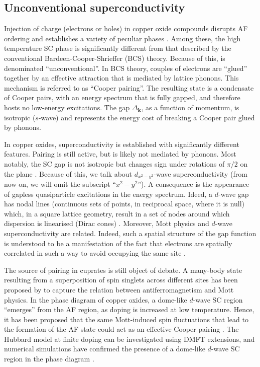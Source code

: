 \subsection{Unconventional superconductivity}\label{subsec:sc-cuprates}

Injection of charge (electrons or holes) in copper oxide compounds disrupts AF ordering and establishes a variety of peculiar phases \cite{keimer2015quantum}. Among these, the high temperature SC phase is significantly different from that described by the conventional Bardeen-Cooper-Shrieffer (BCS) theory. Because of this, is denominated ``unconventional''. In BCS theory, couples of electrons are ``glued'' together by an effective attraction that is mediated by lattice phonons. This mechanism is referred to as ``Cooper pairing''. The resulting state is a condensate of Cooper pairs, with an energy spectrum that is fully gapped, and therefore hosts no low-energy excitations. The gap $\Delta_\mathbf{k}$, as a function of momentum, is isotropic ($s$-wave) and represents the energy cost of breaking a Cooper pair glued by phonons.

In copper oxides, superconductivity is established with significantly different features. Pairing is still active, but is likely not mediated by phonons. Most notably, the SC gap is not isotropic but changes sign under rotations of $\pi/2$ on the plane \cite{scalapino2012common}. Because of this, we talk about $d_{x^2-y^2}$-wave superconductivity (from now on, we will omit the subscript ``$x^2-y^2$''). A consequence is the appearance of gapless quasiparticle excitations in the energy spectrum. Ideed, a $d$-wave gap has nodal lines (continuous sets of points, in reciprocal space, where it is null) which, in a square lattice geometry, result in a set of nodes around which dispersion is linearised (Dirac cones) \cite{coleman2015introduction}. Moreover, Mott physics and $d$-wave superconductivity are related. Indeed, such a spatial structure of the gap function is understood to be a manifestation of the fact that electrons are spatially correlated in such a way to avoid occupying the same site \cite{scalapino2012common}.

The source of pairing in cuprates is still object of debate. A many-body state resulting from a superposition of spin singlets across different sites has been proposed by \citeauthor{anderson1973resonating} \cite{anderson1973resonating,fazekas1974ground} to capture the relation between antiferromagnetism and Mott physics. In the phase diagram of copper oxides, a dome-like $d$-wave SC region ``emerges'' from the AF region, as doping is increased at low temperature. Hence, it has been proposed that the same Mott-induced spin fluctuations that lead to the formation of the AF state could act as an effective Cooper pairing \cite{coleman2015introduction,monod1986possible,miyake1986spin,scalapino1986d-wave}. The Hubbard model at finite doping can be investigated using DMFT extensions, and numerical simulations have confirmed the presence of a dome-like $d$-wave SC region in the phase diagram \cite{walsh2023superconductivity}.

